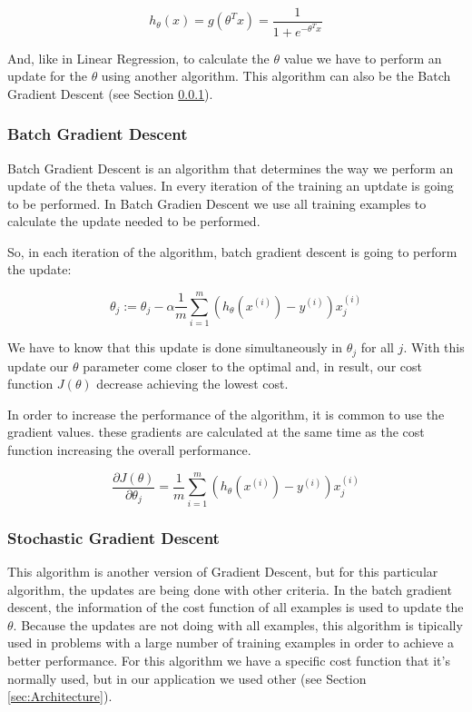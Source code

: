 \documentclass[12pt]{article}
\begin{document}
 \begin{equation}
  h_{\theta}(x)=g(\theta^Tx)=\frac{1}{1+e^{-\theta^Tx}}
\end{equation}

 And, like in Linear Regression, to calculate the $\theta$ value we have to perform an update for the $\theta$ using another algorithm. This algorithm can also be the Batch Gradient Descent (see Section \ref{sec:Gradient}).
\subsubsection{Batch Gradient Descent}
\label{sec:Gradient}
Batch Gradient Descent is an algorithm that determines the way we perform an update of the theta values. In every iteration of the training an uptdate is going to be performed. In Batch Gradien Descent we use all training examples to calculate the update needed to be performed. 

So, in each iteration of the algorithm, batch gradient descent is going to perform the update:

 \begin{equation}
 \theta_{j}:= \theta_{j} - \alpha \frac{1}{m} \displaystyle\sum_{i=1}^{m} (h_{\theta}(x^{(i)})-y^{(i)})x_{j}^{(i)}
\end{equation}

We have to know that this update is done simultaneously in $\theta_{j}$ for all $j$. With this update our $\theta$ parameter come closer to the optimal and, in result, our cost function $J(\theta)$ decrease achieving the lowest cost.

In order to increase the performance of the algorithm, it is common to use the gradient values. these gradients are calculated at the same time as the cost function increasing the overall performance.

\begin{equation}
 \frac{\partial J(\theta)}{\partial\theta_{j}}= \frac{1}{m} \displaystyle\sum_{i=1}^{m} (h_{\theta}(x^{(i)})-y^{(i)})x_{j}^{(i)}
\end{equation}

\subsubsection{Stochastic Gradient Descent}
\label{sec:SGradient}
This algorithm is another version of Gradient Descent, but for this particular algorithm, the updates are being done with other criteria. In the batch gradient descent, the information of the cost function of all examples is used to update the $\theta$. Because the updates are not doing with all examples, this algorithm is tipically used in problems with a large number of training examples in order to achieve a better performance. For this algorithm we have a specific cost function that it's normally used, but in our application we used other (see Section \ref{sec:Architecture}).
\end{document}
